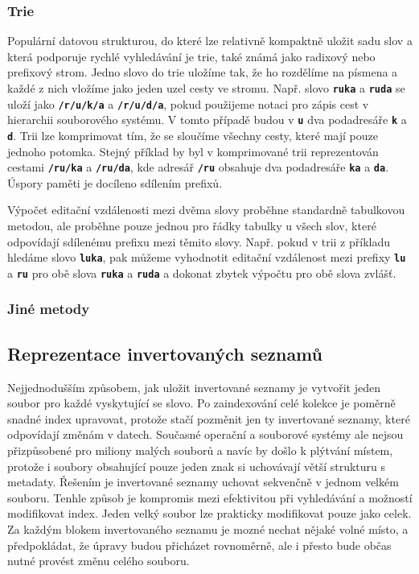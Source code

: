 \documentclass[11pt,letterpaper,oneside,openright]{book}
\newcommand{\bftt}[1]{\texttt{\textbf{#1}}}
\begin{document}
\subsubsection{Trie}
Populární datovou strukturou, do které lze relativně kompaktně uložit sadu slov
a která podporuje rychlé vyhledávání je trie, také známá jako radixový nebo
prefixový strom. Jedno slovo do trie uložíme tak, že ho rozdělíme na písmena a
každé z nich vložíme jako jeden uzel cesty ve stromu. Např. slovo \bftt{ruka} a
\bftt{ruda} se uloží jako \bftt{/r/u/k/a} a \bftt{/r/u/d/a}, pokud použijeme
notaci pro zápis cest v hierarchii souborového systému. V tomto případě budou v
 \bftt{u} dva podadresáře \bftt{k} a \bftt{d}. Trii lze
komprimovat tím, že se sloučíme všechny cesty, které mají pouze jednoho
potomka. Stejný příklad by byl v komprimované trii reprezentován cestami
\bftt{/ru/ka} a \bftt{/ru/da}, kde adresář \bftt{/ru} obsahuje dva podadresáře
\bftt{ka} a \bftt{da}. Úspory paměti je docíleno sdílením prefixů.

Výpočet editační vzdálenosti mezi dvěma slovy proběhne standardně tabulkovou
metodou, ale proběhne pouze jednou pro řádky tabulky u všech slov, které
odpovídají sdílenému prefixu mezi těmito slovy. Např. pokud v trii z příkladu
hledáme slovo \bftt{luka}, pak můžeme vyhodnotit editační vzdálenost mezi
prefixy \bftt{lu} a \bftt{ru} pro obě slova \bftt{ruka} a \bftt{ruda} a dokonat
zbytek výpočtu pro obě slova zvlášť.



\subsubsection{Jiné metody}

\subsection{Reprezentace invertovaných seznamů}
Nejjednodušším způsobem, jak uložit invertované seznamy je vytvořit jeden
soubor pro každé vyskytující se slovo. Po zaindexování celé kolekce je poměrně
snadné index upravovat, protože stačí pozměnit jen ty invertované seznamy,
které odpovídají změnám v datech. Současné operační a souborové systémy ale
nejsou přizpůsobené pro miliony malých souborů a navíc by došlo k plýtvání
místem, protože i soubory obsahující pouze jeden znak si uchovávají větší
strukturu s metadaty. Řešením je invertované seznamy uchovat sekvenčně v jednom
velkém souboru. Tenhle způsob je kompromis mezi efektivitou při vyhledávání a
možností modifikovat index. Jeden velký soubor lze prakticky modifikovat pouze
jako celek. Za každým blokem invertovaného seznamu je mozné nechat nějaké volné
místo, a předpokládat, že úpravy budou přicházet rovnoměrně, ale i přesto bude
občas nutné provést změnu celého souboru.
\end{document}
